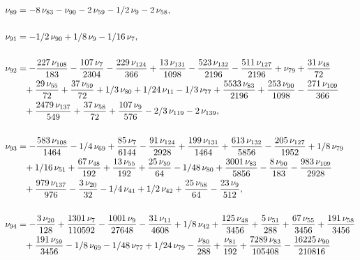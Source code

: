 \documentclass[a4paper,12pt, DIV=14, BCOR=5mm, twoside, headsepline, numbers=noenddot]{scrbook}
\begin{document}
\begin{align}\label{AreaSol8}
\begin{aligned}
\nu_{{89}}&=-8\,\nu_{{83}}-\nu_{{90}}-2\,
\nu_{{59}}-1/2\,\nu_{{9}}-2\,\nu_{{58}}, \\
\\
\nu_{{91}}&=-1/2\,\nu_{{90}}+1/
8\,\nu_{{9}}-1/16\,\nu_{{7}}, \\
\\
\nu_{{92}}&=-{\frac {227\,\nu_{{108}}}{183
}}-{\frac {107\,\nu_{{7}}}{2304}}-{\frac {229\,\nu_{{124}}}{366}}+{
\frac {13\,\nu_{{131}}}{1098}}-{\frac {523\,\nu_{{132}}}{2196}}-{
\frac {511\,\nu_{{127}}}{2196}}+\nu_{{79}}+{\frac {31\,\nu_{{48}}}{72}
}\\
 &\hphantom{=}+{\frac {29\,\nu_{{55}}}{72}}+{\frac {37\,\nu_{{59}}}{72}}+1/3\,\nu_{
{80}}+1/24\,\nu_{{11}}-1/3\,\nu_{{77}}+{\frac {5533\,\nu_{{83}}}{2196}
}+{\frac {253\,\nu_{{90}}}{1098}}-{\frac {271\,\nu_{{109}}}{366}}\\
 &\hphantom{=}+{
\frac {2479\,\nu_{{137}}}{549}}+{\frac {37\,\nu_{{58}}}{72}}+{\frac {
107\,\nu_{{9}}}{576}}-2/3\,\nu_{{119}}-2\,\nu_{{139}}, \\
\\
\nu_{{93}}&=-{
\frac {583\,\nu_{{108}}}{1464}}-1/4\,\nu_{{69}}+{\frac {85\,\nu_{{7}}
}{6144}}-{\frac {91\,\nu_{{124}}}{2928}}+{\frac {199\,\nu_{{131}}}{
1464}}+{\frac {613\,\nu_{{132}}}{5856}}-{\frac {205\,\nu_{{127}}}{1952
}}+1/8\,\nu_{{79}}\\
 &\hphantom{=}+1/16\,\nu_{{51}}+{\frac {67\,\nu_{{48}}}{192}}+{
\frac {13\,\nu_{{55}}}{192}}+{\frac {25\,\nu_{{59}}}{64}}-1/48\,\nu_{{
80}}+{\frac {3001\,\nu_{{83}}}{5856}}-{\frac {8\,\nu_{{90}}}{183}}-{
\frac {983\,\nu_{{109}}}{2928}}\\
 &\hphantom{=}+{\frac {979\,\nu_{{137}}}{976}}-{
\frac {3\,\nu_{{20}}}{32}}-1/4\,\nu_{{41}}+1/2\,\nu_{{42}}+{\frac {25
\,\nu_{{58}}}{64}}-{\frac {23\,\nu_{{9}}}{512}}, \\
\\
\nu_{{94}}&=-{\frac {3
\,\nu_{{20}}}{128}}+{\frac {1301\,\nu_{{7}}}{110592}}-{\frac {1001\,
\nu_{{9}}}{27648}}-{\frac {31\,\nu_{{11}}}{4608}}+1/8\,\nu_{{42}}+{
\frac {125\,\nu_{{48}}}{3456}}+{\frac {5\,\nu_{{51}}}{288}}+{\frac {67
\,\nu_{{55}}}{3456}}+{\frac {191\,\nu_{{58}}}{3456}}\\
 &\hphantom{=}+{\frac {191\,\nu_
{{59}}}{3456}}-1/8\,\nu_{{69}}-1/48\,\nu_{{77}}+1/24\,\nu_{{79}}-{
\frac {\nu_{{80}}}{288}}+{\frac {\nu_{{81}}}{192}}+{\frac {7289\,\nu_{
{83}}}{105408}}-{\frac {16225\,\nu_{{90}}}{210816}}\\

\end{aligned}
\end{align}
\end{document}
